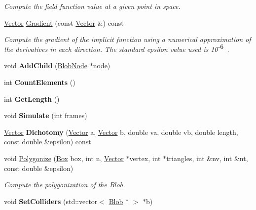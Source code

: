 \begin{DoxyCompactItemize}
\begin{DoxyCompactList}\small\item\em Compute the field function value at a given point in space. \item\end{DoxyCompactList}\item 
\hypertarget{class_blob_a4ca8f2949e4548510f9865b4114d6f09}{
\hyperlink{class_vector}{Vector} \hyperlink{class_blob_a4ca8f2949e4548510f9865b4114d6f09}{Gradient} (const \hyperlink{class_vector}{Vector} \&) const }
\label{class_blob_a4ca8f2949e4548510f9865b4114d6f09}

\begin{DoxyCompactList}\small\item\em Compute the gradient of the implicit function using a numerical approximation of the derivatives in each direction. The standard epsilon value used is 10$^{\mbox{-\/6}}$ . \item\end{DoxyCompactList}\item 
\hypertarget{class_blob_ae4e2f414844e733e03f47ceb8aff0d8b}{
void {\bfseries AddChild} (\hyperlink{class_blob_node}{BlobNode} $\ast$node)}
\label{class_blob_ae4e2f414844e733e03f47ceb8aff0d8b}

\item 
\hypertarget{class_blob_ac2097f5c1628ea39d4bd59bf4a0a24e3}{
int {\bfseries CountElements} ()}
\label{class_blob_ac2097f5c1628ea39d4bd59bf4a0a24e3}

\item 
\hypertarget{class_blob_ae92049b436d89c99f3719ddc93060f58}{
int {\bfseries GetLength} ()}
\label{class_blob_ae92049b436d89c99f3719ddc93060f58}

\item 
\hypertarget{class_blob_ae69cdceffb9025d0c496cc1bf81410b3}{
void {\bfseries Simulate} (int frames)}
\label{class_blob_ae69cdceffb9025d0c496cc1bf81410b3}

\item 
\hypertarget{class_blob_ac41016d1f9e3a6661d89880616842c27}{
\hyperlink{class_vector}{Vector} {\bfseries Dichotomy} (\hyperlink{class_vector}{Vector} a, \hyperlink{class_vector}{Vector} b, double va, double vb, double length, const double \&epsilon) const }
\label{class_blob_ac41016d1f9e3a6661d89880616842c27}

\item 
void \hyperlink{class_blob_aa3233eb6028b994f42b41a3d9ccabf1d}{Polygonize} (\hyperlink{class_box}{Box} box, int n, \hyperlink{class_vector}{Vector} $\ast$vertex, int $\ast$triangles, int \&nv, int \&nt, const double \&epsilon)
\begin{DoxyCompactList}\small\item\em Compute the polygonization of the \hyperlink{class_blob}{Blob}. \item\end{DoxyCompactList}\item 
\hypertarget{class_blob_ac91b183c8813c031d3fce0d545e1f163}{
void {\bfseries SetColliders} (std::vector$<$ \hyperlink{class_blob}{Blob} $\ast$ $>$ $\ast$b)}
\label{class_blob_ac91b183c8813c031d3fce0d545e1f163}


\end{DoxyCompactItemize}
